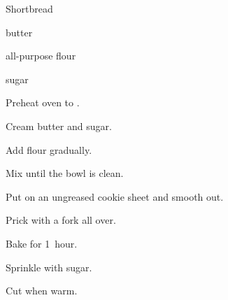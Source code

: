 \begin{recipe}{Shortbread}{}{}

\begin{ingredients}
\item {} butter
\item {} all-purpose flour
\item {} sugar
\end{ingredients}

\begin{directions}
\item Preheat oven to .
\item Cream butter and sugar.
\item Add flour gradually.
\item Mix until the bowl is clean.
\item Put on an ungreased cookie sheet and smooth out.
\item Prick with a fork all over.
\item Bake for 1~hour.
\item Sprinkle with sugar.
\item Cut when warm.
\end{directions}

\end{recipe}
